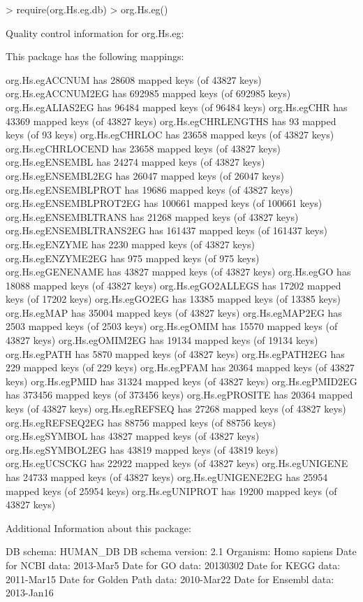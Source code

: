 \documentclass[11pt]{article}
\renewenvironment{Schunk}{\vspace{\topsep}}{\vspace{\topsep}}
\begin{document}
\begin{Schunk}
\begin{Sinput}
> require(org.Hs.eg.db)
> org.Hs.eg()
\end{Sinput}
\begin{Soutput}
Quality control information for org.Hs.eg:


This package has the following mappings:

org.Hs.egACCNUM has 28608 mapped keys (of 43827 keys)
org.Hs.egACCNUM2EG has 692985 mapped keys (of 692985 keys)
org.Hs.egALIAS2EG has 96484 mapped keys (of 96484 keys)
org.Hs.egCHR has 43369 mapped keys (of 43827 keys)
org.Hs.egCHRLENGTHS has 93 mapped keys (of 93 keys)
org.Hs.egCHRLOC has 23658 mapped keys (of 43827 keys)
org.Hs.egCHRLOCEND has 23658 mapped keys (of 43827 keys)
org.Hs.egENSEMBL has 24274 mapped keys (of 43827 keys)
org.Hs.egENSEMBL2EG has 26047 mapped keys (of 26047 keys)
org.Hs.egENSEMBLPROT has 19686 mapped keys (of 43827 keys)
org.Hs.egENSEMBLPROT2EG has 100661 mapped keys (of 100661 keys)
org.Hs.egENSEMBLTRANS has 21268 mapped keys (of 43827 keys)
org.Hs.egENSEMBLTRANS2EG has 161437 mapped keys (of 161437 keys)
org.Hs.egENZYME has 2230 mapped keys (of 43827 keys)
org.Hs.egENZYME2EG has 975 mapped keys (of 975 keys)
org.Hs.egGENENAME has 43827 mapped keys (of 43827 keys)
org.Hs.egGO has 18088 mapped keys (of 43827 keys)
org.Hs.egGO2ALLEGS has 17202 mapped keys (of 17202 keys)
org.Hs.egGO2EG has 13385 mapped keys (of 13385 keys)
org.Hs.egMAP has 35004 mapped keys (of 43827 keys)
org.Hs.egMAP2EG has 2503 mapped keys (of 2503 keys)
org.Hs.egOMIM has 15570 mapped keys (of 43827 keys)
org.Hs.egOMIM2EG has 19134 mapped keys (of 19134 keys)
org.Hs.egPATH has 5870 mapped keys (of 43827 keys)
org.Hs.egPATH2EG has 229 mapped keys (of 229 keys)
org.Hs.egPFAM has 20364 mapped keys (of 43827 keys)
org.Hs.egPMID has 31324 mapped keys (of 43827 keys)
org.Hs.egPMID2EG has 373456 mapped keys (of 373456 keys)
org.Hs.egPROSITE has 20364 mapped keys (of 43827 keys)
org.Hs.egREFSEQ has 27268 mapped keys (of 43827 keys)
org.Hs.egREFSEQ2EG has 88756 mapped keys (of 88756 keys)
org.Hs.egSYMBOL has 43827 mapped keys (of 43827 keys)
org.Hs.egSYMBOL2EG has 43819 mapped keys (of 43819 keys)
org.Hs.egUCSCKG has 22922 mapped keys (of 43827 keys)
org.Hs.egUNIGENE has 24733 mapped keys (of 43827 keys)
org.Hs.egUNIGENE2EG has 25954 mapped keys (of 25954 keys)
org.Hs.egUNIPROT has 19200 mapped keys (of 43827 keys)


Additional Information about this package:

DB schema: HUMAN_DB
DB schema version: 2.1
Organism: Homo sapiens
Date for NCBI data: 2013-Mar5
Date for GO data: 20130302
Date for KEGG data: 2011-Mar15
Date for Golden Path data: 2010-Mar22
Date for Ensembl data: 2013-Jan16
\end{Soutput}
\end{Schunk}
\end{document}
